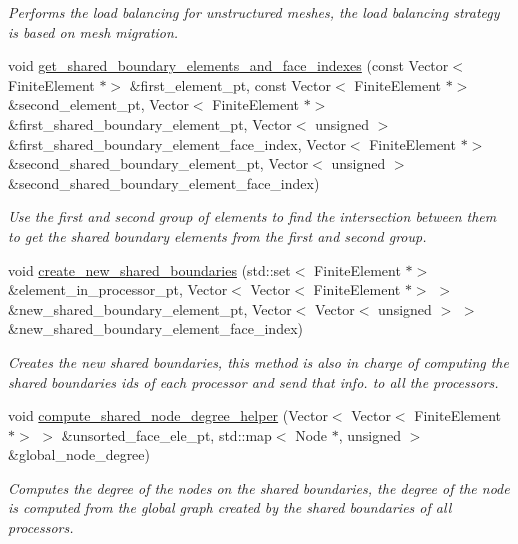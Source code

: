 \begin{DoxyCompactItemize}
\begin{DoxyCompactList}\small\item\em Performs the load balancing for unstructured meshes, the load balancing strategy is based on mesh migration. \end{DoxyCompactList}\item 
void \hyperlink{classoomph_1_1RefineableTriangleMesh_a51a28f4e7fccb020234c055bb42b8ef5}{get\+\_\+shared\+\_\+boundary\+\_\+elements\+\_\+and\+\_\+face\+\_\+indexes} (const Vector$<$ Finite\+Element $\ast$$>$ \&first\+\_\+element\+\_\+pt, const Vector$<$ Finite\+Element $\ast$$>$ \&second\+\_\+element\+\_\+pt, Vector$<$ Finite\+Element $\ast$$>$ \&first\+\_\+shared\+\_\+boundary\+\_\+element\+\_\+pt, Vector$<$ unsigned $>$ \&first\+\_\+shared\+\_\+boundary\+\_\+element\+\_\+face\+\_\+index, Vector$<$ Finite\+Element $\ast$$>$ \&second\+\_\+shared\+\_\+boundary\+\_\+element\+\_\+pt, Vector$<$ unsigned $>$ \&second\+\_\+shared\+\_\+boundary\+\_\+element\+\_\+face\+\_\+index)
\begin{DoxyCompactList}\small\item\em Use the first and second group of elements to find the intersection between them to get the shared boundary elements from the first and second group. \end{DoxyCompactList}\item 
void \hyperlink{classoomph_1_1RefineableTriangleMesh_adb26d1dbe4f06311599020171ec45140}{create\+\_\+new\+\_\+shared\+\_\+boundaries} (std\+::set$<$ Finite\+Element $\ast$$>$ \&element\+\_\+in\+\_\+processor\+\_\+pt, Vector$<$ Vector$<$ Finite\+Element $\ast$$>$ $>$ \&new\+\_\+shared\+\_\+boundary\+\_\+element\+\_\+pt, Vector$<$ Vector$<$ unsigned $>$ $>$ \&new\+\_\+shared\+\_\+boundary\+\_\+element\+\_\+face\+\_\+index)
\begin{DoxyCompactList}\small\item\em Creates the new shared boundaries, this method is also in charge of computing the shared boundaries ids of each processor and send that info. to all the processors. \end{DoxyCompactList}\item 
void \hyperlink{classoomph_1_1RefineableTriangleMesh_a4c2c3ff989c57ac84bbc9a8b5fb1db26}{compute\+\_\+shared\+\_\+node\+\_\+degree\+\_\+helper} (Vector$<$ Vector$<$ Finite\+Element $\ast$$>$ $>$ \&unsorted\+\_\+face\+\_\+ele\+\_\+pt, std\+::map$<$ Node $\ast$, unsigned $>$ \&global\+\_\+node\+\_\+degree)
\begin{DoxyCompactList}\small\item\em Computes the degree of the nodes on the shared boundaries, the degree of the node is computed from the global graph created by the shared boundaries of all processors. \end{DoxyCompactList}\item 
$$
\end{DoxyCompactItemize}
